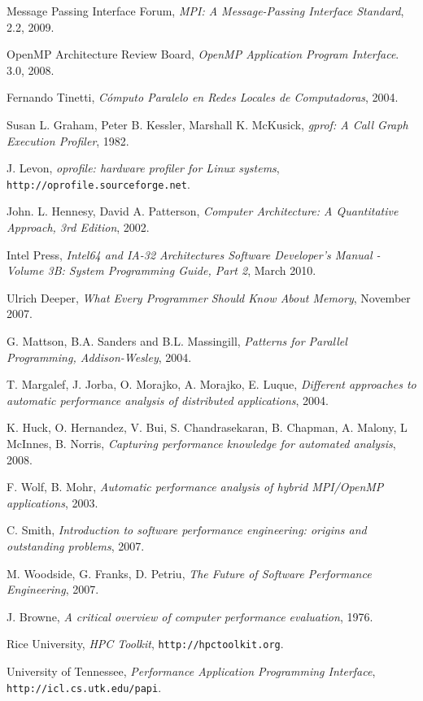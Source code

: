 \documentclass[a4paper]{report}
\begin{document}
\begin{thebibliography}{9}
  
  Message Passing Interface Forum,
  \emph{MPI: A Message-Passing Interface Standard},
  2.2,
  2009.

  OpenMP Architecture Review Board,
  \emph{OpenMP Application Program Interface}.
  3.0,
  2008.

  Fernando Tinetti,
  \emph{C\'omputo Paralelo en Redes Locales de Computadoras},
  2004.

 Susan L. Graham,  Peter B. Kessler,  Marshall K. McKusick,
 \emph{gprof: A Call Graph Execution Profiler},
 1982.

J. Levon,
\emph{oprofile: hardware profiler for Linux systems},
{\tt http://oprofile.sourceforge.net}.

 John. L. Hennesy, David A. Patterson,
 \emph{Computer Architecture: A Quantitative Approach, 3rd Edition},
 2002.

 Intel Press,
 \emph{Intel64 and IA-32 Architectures Software Developer's Manual - Volume 3B: System Programming Guide, Part 2},
 March 2010.

 Ulrich Deeper,
 \emph{What Every Programmer Should Know About Memory},
 November 2007.

 G. Mattson, B.A. Sanders and B.L. Massingill, 
 \emph{Patterns for Parallel Programming, Addison-Wesley},
 2004.

 T. Margalef, J. Jorba, O. Morajko, A. Morajko, E. Luque,
 \emph{Different approaches to automatic performance analysis of distributed applications},
 2004.

 K. Huck, O. Hernandez, V. Bui, S. Chandrasekaran, B. Chapman, A. Malony, L McInnes, B. Norris,
 \emph{Capturing performance knowledge for automated analysis},
 2008.

 F. Wolf, B. Mohr,
 \emph{Automatic performance analysis of hybrid MPI/OpenMP applications},
 2003.

 C. Smith,
 \emph{Introduction to software performance engineering: origins and outstanding problems},
 2007.

 M. Woodside, G. Franks, D. Petriu,
 \emph{The Future of Software Performance Engineering},
 2007.

 J. Browne,
 \emph{A critical overview of computer performance evaluation},
 1976.

  Rice University,
 \emph{HPC Toolkit},
 {\tt http://hpctoolkit.org}.

  University of Tennessee,
  \emph{Performance Application Programming Interface},
  {\tt http://icl.cs.utk.edu/papi}.


\end{thebibliography}
\end{document}
